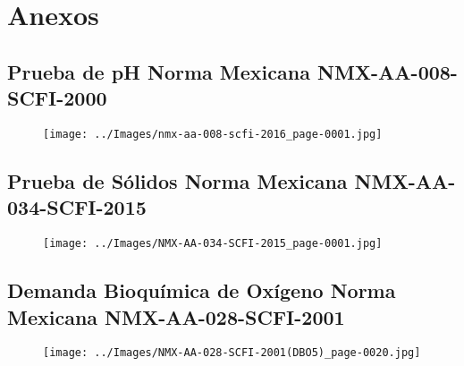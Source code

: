 \section*{Anexos}
\subsection*{Prueba de pH Norma Mexicana NMX-AA-008-SCFI-2000}
\begin{center}
	\begin{figure}[h]
		\texttt{[image: ../Images/nmx-aa-008-scfi-2016\_page-0001.jpg]}
	\end{figure}
\end{center}
\clearpage

\subsection*{Prueba de Sólidos Norma Mexicana NMX-AA-034-SCFI-2015}
\begin{center}
	\begin{figure}[h]
		\texttt{[image: ../Images/NMX-AA-034-SCFI-2015\_page-0001.jpg]}
	\end{figure}
\end{center}
\clearpage

\subsection*{Demanda Bioquímica de Oxígeno Norma Mexicana NMX-AA-028-SCFI-2001}
\begin{center}
	\begin{figure}[h]
		\texttt{[image: ../Images/NMX-AA-028-SCFI-2001(DBO5)\_page-0020.jpg]}
	\end{figure}
\end{center}
\clearpage
